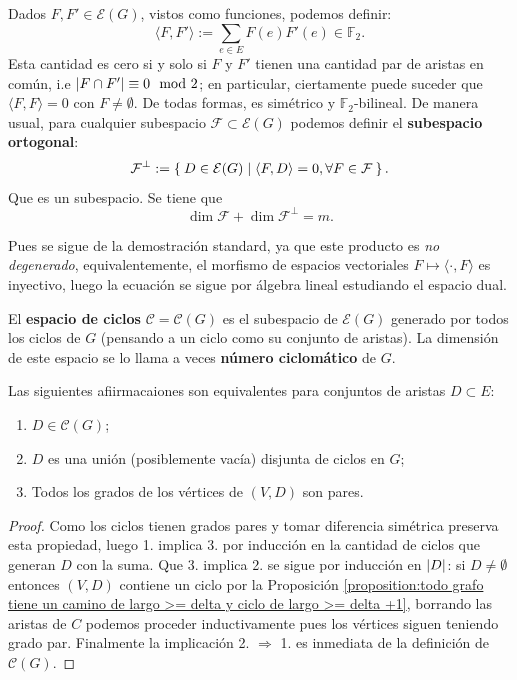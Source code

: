 \documentclass[../main.tex]{subfiles}
\begin{document}
Dados $F,F' \in \mathcal{E} (G)$, vistos como funciones, podemos definir:
\[
    \langle F, F' \rangle := \sum_{e \in E} F (e) F'(e) \in \mathbb{F}_2.
\]
Esta cantidad es cero si y solo si $F$ y $F'$ tienen una cantidad par de aristas en común, i.e $\left \vert F \cap F' \right \vert \equiv 0 \mod 2$; en particular, ciertamente puede suceder que $\langle F , F \rangle = 0$ con $F \neq \emptyset$. De todas formas, es simétrico y $\mathbb{F}_2$-bilineal.
De manera usual, para cualquier subespacio $\mathcal{F} \subset \mathcal{E}(G)$ podemos definir el \textbf{subespacio ortogonal}:
\[
    \mathcal{F}^\perp := \Set{D \in \mathcal{E}(G) | \langle F , D \rangle = 0, \\ \forall F \in \mathcal{F}}.
\]
Que es un subespacio. Se tiene que
\begin{equation}\label{eq:formula de la dimension para los subsespacios ortogonales de E(G)}
\dim \mathcal{F} + \dim \mathcal{F}^\perp = m.
\end{equation}

Pues se sigue de la demostración standard, ya que este producto es \textit{no degenerado}, equivalentemente, el morfismo de espacios vectoriales $F \mapsto \langle \cdot, F \rangle$ es inyectivo, luego la ecuación se sigue por álgebra lineal estudiando el espacio dual.

\begin{definition}
El \textbf{espacio de ciclos} $\mathcal{C} = \mathcal{C}(G)$ es el subespacio de $\mathcal{E}(G)$ generado por todos los ciclos de $G$ (pensando a un ciclo como su conjunto de aristas). La dimensión de este espacio se lo llama a veces \textbf{número ciclomático} de $G$.
\end{definition}

\begin{proposition}\label{proposition:apendice - definiciones equivalentes de elemento del subespacio de ciclos}
Las siguientes afiirmacaiones son equivalentes para conjuntos de aristas $D \subset E$:
\begin{enumerate}[1.]
\item $D \in \mathcal{C} (G)$;
\item $D$ es una unión (posiblemente vacía) disjunta de ciclos en $G$;
\item Todos los grados de los vértices de $(V,D)$ son pares.
\end{enumerate}
\end{proposition}
\begin{proof}
Como los ciclos tienen grados pares y tomar diferencia simétrica preserva esta propiedad, luego 1. implica 3. por inducción en la cantidad de ciclos que generan $D$ con la suma. Que 3. implica 2. se sigue por inducción en $\left \vert D \right \vert$: si $D \neq \emptyset$ entonces $(V,D)$ contiene un ciclo por la Proposición \ref{proposition:todo grafo tiene un camino de largo >= delta y ciclo de largo >= delta +1}, borrando las aristas de $C$ podemos proceder inductivamente pues los vértices siguen teniendo grado par. Finalmente la implicación 2. $\Rightarrow$ 1. es inmediata de la definición de $\mathcal{C}(G)$.
\end{proof}
\end{document}
